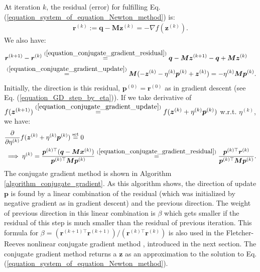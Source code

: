 \documentclass[lang=cn,10pt]{gorgeousnbook}
\numberwithin{equation}{section}%
\numberwithin{figure}{section}%
\begin{document}
At iteration $k$, the residual (error) for fulfilling  Eq. (\ref{equation_system_of_equation_Newton_method}) is:
\begin{align}\label{equation_conjugate_gradient_residual}
\boldsymbol{r}^{(k)} := \boldsymbol{q} - \boldsymbol{M}\boldsymbol{z}^{(k)} = -\nabla f(\boldsymbol{z}^{(k)}).
\end{align}
We also have:
\begin{align*}
&\boldsymbol{r}^{(k+1)} - \boldsymbol{r}^{(k)} \overset{(\ref{equation_conjugate_gradient_residual})}{=} \boldsymbol{q} - \boldsymbol{M}\boldsymbol{z}^{(k+1)} - \boldsymbol{q} + \boldsymbol{M}\boldsymbol{z}^{(k)} \\
&\overset{(\ref{equation_conjugate_gradient_update})}{=} \boldsymbol{M}(-\boldsymbol{z}^{(k)} - \eta^{(k)} \boldsymbol{p}^{(k)} + \boldsymbol{z}^{(k)}) = -\eta^{(k)} \boldsymbol{M} \boldsymbol{p}^{(k)}.
\end{align*}
Initially, the direction is this residual, $\boldsymbol{p}^{(0)} = \boldsymbol{r}^{(0)}$ as in gradient descent (see Eq. (\ref{equation_GD_step_by_eta})).
If we take derivative of $f(\boldsymbol{z}^{(k+1)}) \overset{(\ref{equation_conjugate_gradient_update})}{=} f(\boldsymbol{z}^{(k)} + \eta^{(k)} \boldsymbol{p}^{(k)})$ w.r.t. $\eta^{(k)}$, we have:
\begin{align*}
&\frac{\partial }{\partial \eta^{(k)}} f(\boldsymbol{z}^{(k)} + \eta^{(k)} \boldsymbol{p}^{(k)}) \overset{\text{set}}{=} 0 \\
&\implies \eta^{(k)} = \frac{\boldsymbol{p}^{(k)\top} (\boldsymbol{q} - \boldsymbol{M} \boldsymbol{x}^{(k)})}{\boldsymbol{p}^{(k)\top} \boldsymbol{M} \boldsymbol{p}^{(k)}} \overset{(\ref{equation_conjugate_gradient_residual})}{=} \frac{\boldsymbol{p}^{(k)\top} \boldsymbol{r}^{(k)}}{\boldsymbol{p}^{(k)\top} \boldsymbol{M} \boldsymbol{p}^{(k)}}.
\end{align*}
The conjugate gradient method is shown in Algorithm \ref{algorithm_conjugate_gradient}. As this algorithm shows, the direction of update $\boldsymbol{p}$ is found by a linear combination of the residual (which was initialized by negative gradient as in gradient descent) and the previous direction. The weight of previous direction in this linear combination is $\beta$ which gets smaller if the residual of this step is much smaller than the residual of previous iteration. This formula for $\beta = (\boldsymbol{r}^{(k+1)\top} \boldsymbol{r}^{(k+1)}) / (\boldsymbol{r}^{(k)\top} \boldsymbol{r}^{(k)})$ is also used in the Fletcher-Reeves nonlinear conjugate gradient method \cite{fletcher1964function}, introduced in the next section.
The conjugate gradient method returns a $\boldsymbol{z}$ as an approximation to the solution to Eq. (\ref{equation_system_of_equation_Newton_method}). 
\end{document}
